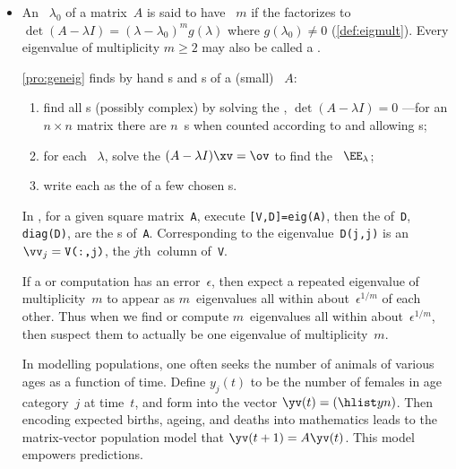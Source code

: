 \begin{itemize}
\item An ~\(\lambda_0\) of a matrix~\(A\) is said to have ~\(m\) if the  factorizes to \(\det(A-\lambda I)=(\lambda-\lambda_0)^mg(\lambda)\) where \(g(\lambda_0)\neq0\) (\cref{def:eigmult}).
Every eigenvalue of multiplicity \(m\geq2\) may also be called a .

\itemme \cref{pro:geneig} finds by hand s and s of a (small) ~\(A\):
\begin{enumerate}
\item find all s (possibly complex) by solving the , \(\det(A-\lambda I)=0\) ---for an \(n\times n\) matrix there are \(n\)~s when counted according to  and allowing s;
\item for each ~\(\lambda\), solve the   \((A-\lambda I)\xv=\ov\) to find the ~\(\EE_\lambda\);
\item write each  as the  of a few chosen s.
\end{enumerate}

In \script, for a given square matrix~\verb|A|, execute 
\verb|[V,D]=eig(A)|, then the  of~\verb|D|, 
\verb|diag(D)|, are the s of~\verb|A|. 
Corresponding to the eigenvalue~\verb|D(j,j)| is an   \(\vv_j=\verb|V(:,j)|\), the \(j\)th~column of~\verb|V|.  

\itemme If a  or computation has an error~\(\epsilon\), then expect a repeated eigenvalue of multiplicity~\(m\) to appear as \(m\)~eigenvalues all within about~\(\epsilon^{1/m}\) of each other.
Thus when we find or compute \(m\)~eigenvalues all within about~\(\epsilon^{1/m}\), then suspect them to actually be one eigenvalue of multiplicity~\(m\).

\itemhi In modelling populations, one often seeks the number of animals of various ages as a function of time.
Define \(y_j(t)\) to be the number of females in age category~\(j\) at time~\(t\), and form into the vector \(\yv(t)=(\hlist yn)\).
Then encoding expected births, ageing, and deaths into mathematics leads to the matrix-vector population model that \(\yv(t+1)=A\yv(t)\).
This model empowers predictions.



\end{itemize}
